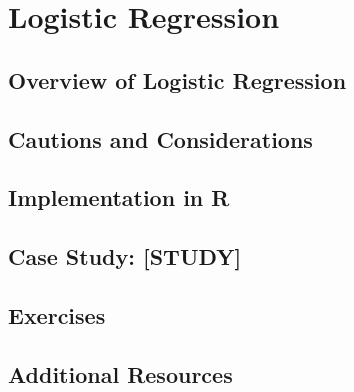 
\chapter{Logistic Regression}

\section{Overview of Logistic Regression}

\section{Cautions and Considerations}

\section{Implementation in R}

\section{Case Study: [STUDY]}

\section{Exercises}

\section{Additional Resources}
